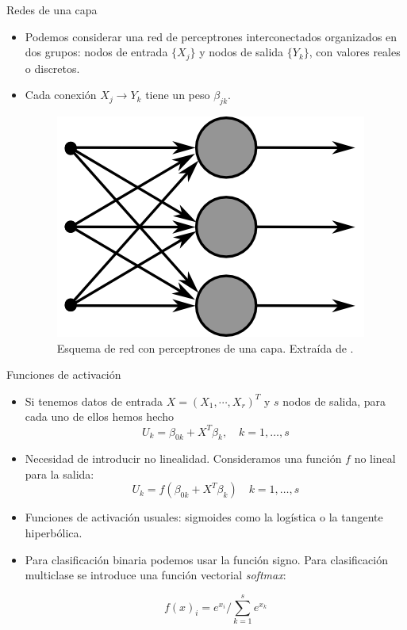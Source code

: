 \documentclass[spanish]{beamer}
\begin{document}
\begin{frame}{Redes de una capa}
\begin{itemize}
  \item Podemos considerar una red de perceptrones interconectados organizados en dos grupos: nodos de entrada $\{X_j\}$ y nodos de salida $\{Y_k\}$, con valores reales o discretos.
  \item Cada conexión $X_j \to Y_k$ tiene un peso $\beta_{jk}$.
  \vspace{1em}

    \begin{figure}[h]
    \centering
    \includegraphics[width=.5\textwidth]{img/single}
    \caption{Esquema de red con perceptrones de una capa. Extraída de \parencite{wiki_single_2015}.}
    \label{fig:perceptron}
  \end{figure}
\end{itemize}
\end{frame}

\begin{frame}{Funciones de activación}
  \begin{itemize}
    \item Si tenemos datos de entrada $X=(X_1, \cdots , X_r)^T$ y $s$ nodos de salida, para cada uno de ellos hemos hecho
    $$U_k = \beta_{0k} + X^T \beta_{k} , \quad k = 1, \dots , s $$
    \item Necesidad de introducir no linealidad. Consideramos una función $f$ no lineal para la salida:
    $$ U_k = f(\beta_{0k} + X^T \beta_k) \quad k = 1, \dots , s$$
  \item Funciones de activación usuales: sigmoides como la logística o la tangente hiperbólica.
  \item Para clasificación binaria podemos usar la función signo. Para clasificación multiclase se introduce una función vectorial \textit{softmax}:

  $$f(x)_i = e^{x_i}/\sum_{k=1}^s e^{x_k}$$
\end{itemize}
\end{frame}
\end{document}
